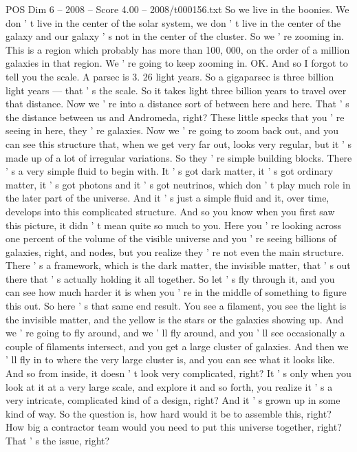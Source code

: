 \begin{textsample}{POS Dim 6 – 2008 – Score 4.00 – 2008/t000156.txt}
So we live in the boonies.
We don ' t live in the center of the solar system, we don ' t live in the center of the galaxy and our galaxy ' s not in the center of the cluster.
So we ' re zooming in.
This is a region which probably has more than 100, 000, on the order of a million galaxies in that region.
We ' re going to keep zooming in.
OK.
And so I forgot to tell you the scale.
A parsec is 3. 26 light years.
So a gigaparsec is three billion light years — that ' s the scale.
So it takes light three billion years to travel over that distance.
Now we ' re into a distance sort of between here and here.
That ' s the distance between us and Andromeda, right?
These little specks that you ' re seeing in here, they ' re galaxies.
Now we ' re going to zoom back out, and you can see this structure that, when we get very far out, looks very regular, but it ' s made up of a lot of irregular variations.
So they ' re simple building blocks.
There ' s a very simple fluid to begin with.
It ' s got dark matter, it ' s got ordinary matter, it ' s got photons and it ' s got neutrinos, which don ' t play much role in the later part of the universe.
And it ' s just a simple fluid and it, over time, develops into this complicated structure.
And so you know when you first saw this picture, it didn ' t mean quite so much to you.
Here you ' re looking across one percent of the volume of the visible universe and you ' re seeing billions of galaxies, right, and nodes, but you realize they ' re not even the main structure.
There ' s a framework, which is the dark matter, the invisible matter, that ' s out there that ' s actually holding it all together.
So let ' s fly through it, and you can see how much harder it is when you ' re in the middle of something to figure this out.
So here ' s that same end result.
You see a filament, you see the light is the invisible matter, and the yellow is the stars or the galaxies showing up.
And we ' re going to fly around, and we ' ll fly around, and you ' ll see occasionally a couple of filaments intersect, and you get a large cluster of galaxies.
And then we ' ll fly in to where the very large cluster is, and you can see what it looks like.
And so from inside, it doesn ' t look very complicated, right?
It ' s only when you look at it at a very large scale, and explore it and so forth, you realize it ' s a very intricate, complicated kind of a design, right?
And it ' s grown up in some kind of way.
So the question is, how hard would it be to assemble this, right?
How big a contractor team would you need to put this universe together, right?
That ' s the issue, right?

\end{textsample}
